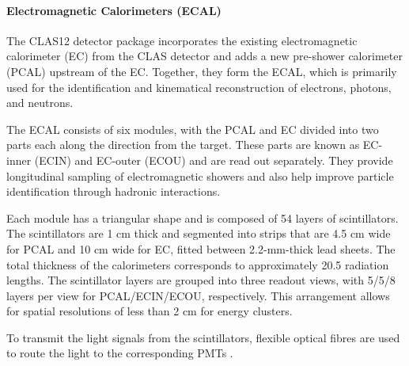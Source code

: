\paragraph{Electromagnetic Calorimeters (ECAL)}
    The CLAS12 detector package incorporates the existing electromagnetic calorimeter (EC) from the CLAS detector and adds a new pre-shower calorimeter (PCAL) upstream of the EC.
    Together, they form the ECAL, which is primarily used for the identification and kinematical reconstruction of electrons, photons, and neutrons.

    The ECAL consists of six modules, with the PCAL and EC divided into two parts each along the direction from the target.
    These parts are known as EC-inner (ECIN) and EC-outer (ECOU) and are read out separately.
    They provide longitudinal sampling of electromagnetic showers and also help improve particle identification through hadronic interactions.

    Each module has a triangular shape and is composed of 54 layers of scintillators.
    The scintillators are 1 cm thick and segmented into strips that are 4.5 cm wide for PCAL and 10 cm wide for EC, fitted between 2.2-mm-thick lead sheets.
    The total thickness of the calorimeters corresponds to approximately 20.5 radiation lengths.
    The scintillator layers are grouped into three readout views, with 5/5/8 layers per view for PCAL/ECIN/ECOU, respectively.
    This arrangement allows for spatial resolutions of less than 2 cm for energy clusters.

    To transmit the light signals from the scintillators, flexible optical fibres are used to route the light to the corresponding PMTs \cite{asryan2020}.

